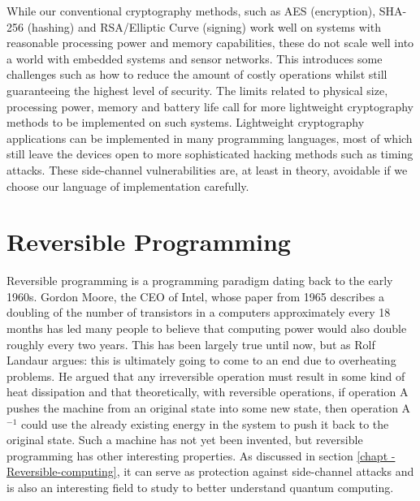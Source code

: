 
While our conventional cryptography methods, such as AES (encryption), SHA-256 (hashing) and RSA/Elliptic Curve (signing) work well on systems with reasonable processing power and memory capabilities, these do not scale well into a world with embedded systems and sensor networks.
This introduces some challenges such as how to reduce the amount of costly operations whilst still guaranteeing the highest level of security. The limits related to physical size, processing power, memory and battery life call for more lightweight cryptography methods to be implemented on such systems.
Lightweight cryptography applications can be implemented in many programming languages, most of which still leave the devices open to more sophisticated hacking methods such as timing attacks. These side-channel vulnerabilities are, at least in theory, avoidable if we choose our language of implementation carefully.

\section{Reversible Programming}

Reversible programming is a programming paradigm dating back to the early 1960s. Gordon Moore, the CEO of Intel, whose paper from 1965 describes a doubling of the number of transistors in a computers approximately every 18 months has led many people to believe that computing power would also double roughly every two years. This has been largely true until now, but as Rolf Landaur argues: this is ultimately going to come to an end due to overheating problems.
He argued that any irreversible operation must result in some kind of heat dissipation and that theoretically, with reversible operations, if operation A pushes the machine from an original state into some new state, then operation A$^{-1}$ could use the already existing energy in the system to push it back to the original state.
Such a machine has not yet been invented, but reversible programming has other interesting properties.
As discussed in section \ref{chapt - Reversible-computing}, it can serve as protection against side-channel attacks and is also an interesting field to study to better understand quantum computing.

